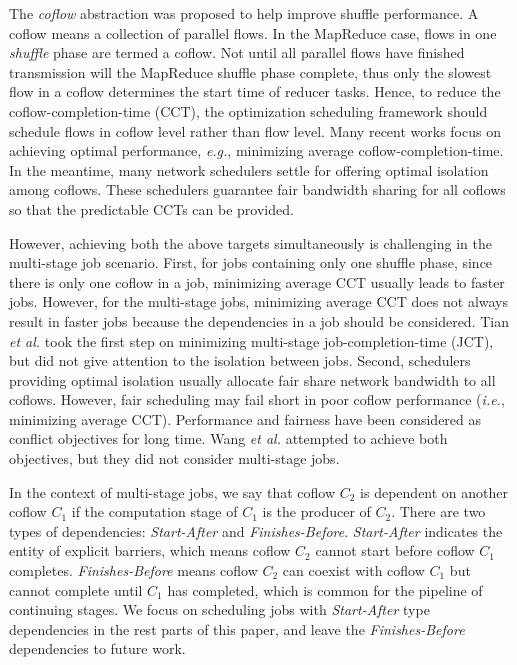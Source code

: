 \documentclass[10pt, conference, letterpaper]{IEEEtran}
\begin{document}
The \emph{coflow} abstraction was proposed to help improve shuffle performance. A coflow means a collection of parallel flows\cite{coflow}. In the MapReduce case, flows in one \emph{shuffle} phase are termed a coflow. %
Not until all parallel flows have finished transmission will the MapReduce shuffle phase complete, thus only the slowest flow %
in a coflow determines the start time of reducer tasks. Hence, to reduce the coflow-completion-time (CCT), the optimization scheduling framework should schedule flows in coflow level rather than flow level. Many recent works focus on achieving optimal performance, \emph{e.g.}, minimizing average coflow-completion-time\cite{varys,aalo,coda,barrat,stream}. In the meantime, many network schedulers settle for offering optimal isolation among coflows\cite{HUG,DRF,faircloud,fair}. These schedulers guarantee fair bandwidth sharing for all coflows so that the predictable CCTs can be provided.

However, achieving both the above targets simultaneously is challenging in the multi-stage job scenario. First, for jobs containing only one shuffle phase, since there is only one coflow in a job, minimizing average CCT usually leads to faster jobs. However, for the multi-stage jobs, minimizing average CCT does not always result in faster jobs because the dependencies in a job should be considered. Tian \emph{et al.}\cite{bingchuan} took the first step on minimizing multi-stage job-completion-time (JCT), but did not give attention to the isolation between jobs. Second, schedulers providing optimal isolation usually allocate fair share network bandwidth to all coflows. %
However, fair scheduling may fail short in poor coflow performance (\emph{i.e.}, minimizing average CCT)\cite{HUG}. Performance and fairness have been considered as conflict objectives for long time. Wang \emph{et al.}\cite{utopia} attempted to achieve both objectives, but they did not consider multi-stage jobs.

In the context of multi-stage jobs, we say that coflow $C_2$ is dependent on another coflow $C_1$ if the computation stage of $C_1$ is the producer of $C_2$. There are two types of dependencies: \emph{Start-After} and \emph{Finishes-Before}. \emph{Start-After} indicates the entity of explicit barriers\cite{Hadoop}, which means coflow $C_2$ cannot start before coflow $C_1$ completes. \emph{Finishes-Before} means coflow $C_2$ can coexist with coflow $C_1$ but cannot complete until $C_1$ has completed, which is common for the pipeline of continuing stages\cite{dryad}. We focus on scheduling jobs with \emph{Start-After} type dependencies in the rest parts of this paper, and leave the \emph{Finishes-Before} dependencies to future work.
\end{document}
